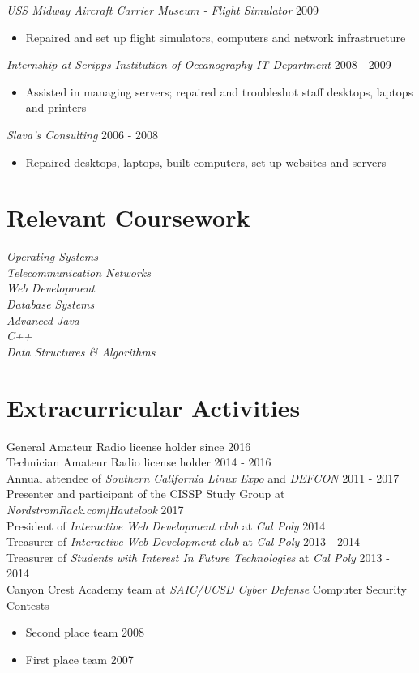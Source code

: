\documentclass[line]{docs/resume/res}
\begin{document}
\begin{resume}
  {\sl USS Midway Aircraft Carrier Museum - Flight Simulator} \hfill 2009
  \begin{itemize} \itemsep -2pt
    \item Repaired and set up flight simulators, computers and network infrastructure
  \end{itemize}

  {\sl Internship at Scripps Institution of Oceanography IT Department} \hfill 2008 - 2009
  \begin{itemize} \itemsep -2pt
    \item Assisted in managing servers; repaired and troubleshot staff desktops, laptops and printers
  \end{itemize}

  {\sl Slava's Consulting} \hfill 2006 - 2008
  \begin{itemize} \itemsep -2pt
    \item Repaired desktops, laptops, built computers, set up websites and servers
  \end{itemize}

\section{Relevant Coursework}
  {\sl Operating Systems } \\
  {\sl Telecommunication Networks } \\
  {\sl Web Development } \\
  {\sl Database Systems } \\
  {\sl Advanced Java} \\
  {\sl C++} \\
  {\sl Data Structures \& Algorithms}

\section{Extracurricular Activities}
  General Amateur Radio license holder since \hfill 2016 \\
  Technician Amateur Radio license holder \hfill 2014 - 2016 \\
  Annual attendee of {\it Southern California Linux Expo} and {\it DEFCON} \hfill 2011 - 2017 \\
  Presenter and participant of the CISSP Study Group at {\it NordstromRack.com|Hautelook} \hfill 2017 \\
  President of {\it Interactive Web Development club} at {\it Cal Poly} \hfill 2014 \\
  Treasurer of {\it Interactive Web Development club} at {\it Cal Poly} \hfill 2013 - 2014 \\
  Treasurer of {\it Students with Interest In Future Technologies} at {\it Cal Poly} \hfill 2013 - 2014 \\
  Canyon Crest Academy team at {\it SAIC/UCSD Cyber Defense} Computer Security Contests
  \begin{itemize} \itemsep -2pt
    \item Second place team \hfill 2008
    \item First place team \hfill 2007
  \end{itemize}

\end{resume}
\end{document}
